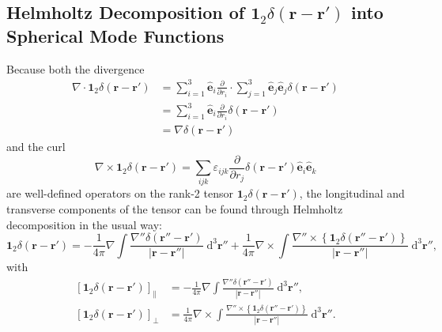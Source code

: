\documentclass{article}
\numberwithin{equation}{section}
\begin{document}
\subsection{Helmholtz Decomposition of $\bm{1}_2\delta(\mathbf{r} - \mathbf{r}')$ into Spherical Mode Functions}\label{sec:helmholtzDelta}

Because both the divergence 
\begin{equation}
\begin{split}
\nabla\cdot\mathbf{1}_2\delta(\mathbf{r} - \mathbf{r}') &= \sum_{i = 1}^3\hat{\mathbf{e}}_i\frac{\partial}{\partial r_i}\cdot\sum_{j = 1}^3\hat{\mathbf{e}}_j\hat{\mathbf{e}}_j\delta(\mathbf{r} - \mathbf{r}')\\
&= \sum_{i = 1}^3\hat{\mathbf{e}}_i\frac{\partial}{\partial r_i}\delta(\mathbf{r} - \mathbf{r}')\\
&= \nabla\delta(\mathbf{r} - \mathbf{r}')
\end{split}
\end{equation}
and the curl
\begin{equation}
\nabla\times\bm{1}_2\delta(\mathbf{r} - \mathbf{r}') = \sum_{ijk}\varepsilon_{ijk}\frac{\partial}{\partial r_j}\delta(\mathbf{r} - \mathbf{r}')\hat{\mathbf{e}}_i\hat{\mathbf{e}}_k
\end{equation}
are well-defined operators on the rank-2 tensor $\bm{1}_2\delta(\mathbf{r} - \mathbf{r}')$, the longitudinal and transverse components of the tensor can be found through Helmholtz decomposition in the usual way:
\begin{equation}
\bm{1}_2\delta(\mathbf{r} - \mathbf{r}') = -\frac{1}{4\pi}\nabla\int\frac{\nabla''\delta(\mathbf{r}''-\mathbf{r}')}{|\mathbf{r} - \mathbf{r}''|}\;\mathrm{d}^3\mathbf{r}'' + \frac{1}{4\pi}\nabla\times\int\frac{\nabla''\times\left\{\bm{1}_2\delta(\mathbf{r}'' - \mathbf{r}')\right\}}{|\mathbf{r} - \mathbf{r}''|}\;\mathrm{d}^3\mathbf{r}'',
\end{equation}
with
\begin{equation}
\begin{split}
\left[\bm{1}_2\delta(\mathbf{r} - \mathbf{r}')\right]_\parallel &= -\frac{1}{4\pi}\nabla\int\frac{\nabla''\delta(\mathbf{r}''-\mathbf{r}')}{|\mathbf{r} - \mathbf{r}''|}\;\mathrm{d}^3\mathbf{r}'',\\
\left[\bm{1}_2\delta(\mathbf{r} - \mathbf{r}')\right]_\perp &= \frac{1}{4\pi}\nabla\times\int\frac{\nabla''\times\left\{\bm{1}_2\delta(\mathbf{r}'' - \mathbf{r}')\right\}}{|\mathbf{r} - \mathbf{r}''|}\;\mathrm{d}^3\mathbf{r}''.
\end{split}
\end{equation}
\end{document}
